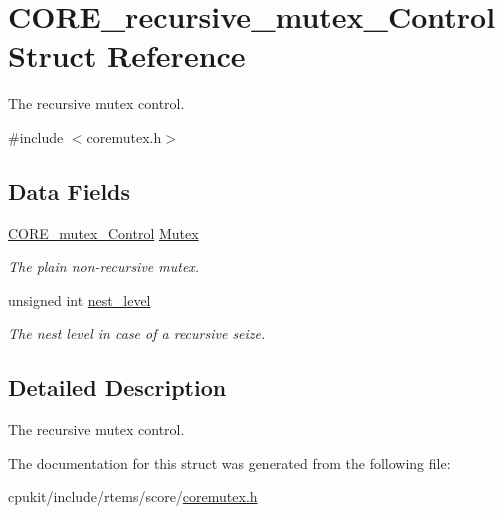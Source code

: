 \hypertarget{structCORE__recursive__mutex__Control}{}\section{C\+O\+R\+E\+\_\+recursive\+\_\+mutex\+\_\+\+Control Struct Reference}
\label{structCORE__recursive__mutex__Control}


The recursive mutex control.  




{\ttfamily \#include $<$coremutex.\+h$>$}

\subsection*{Data Fields}
\begin{DoxyCompactItemize}
\item 
\mbox{\label{structCORE__recursive__mutex__Control_abf018b1c4f162b0231f8d2506b3f8349}} 
\mbox{\hyperlink{structCORE__mutex__Control}{C\+O\+R\+E\+\_\+mutex\+\_\+\+Control}} \mbox{\hyperlink{structCORE__recursive__mutex__Control_abf018b1c4f162b0231f8d2506b3f8349}{Mutex}}
\begin{DoxyCompactList}\small\item\em The plain non-\/recursive mutex. \end{DoxyCompactList}\item 
\mbox{\label{structCORE__recursive__mutex__Control_a71811985b0d419a0f4d5bbbc9abf943f}} 
unsigned int \mbox{\hyperlink{structCORE__recursive__mutex__Control_a71811985b0d419a0f4d5bbbc9abf943f}{nest\+\_\+level}}
\begin{DoxyCompactList}\small\item\em The nest level in case of a recursive seize. \end{DoxyCompactList}\end{DoxyCompactItemize}


\subsection{Detailed Description}
The recursive mutex control. 

The documentation for this struct was generated from the following file\+:\begin{DoxyCompactItemize}
\item 
cpukit/include/rtems/score/\mbox{\hyperlink{coremutex_8h}{coremutex.\+h}}\end{DoxyCompactItemize}
